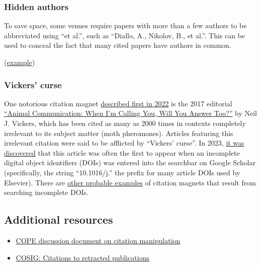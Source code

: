 \documentclass[letterpaper, 12pt]{article}
\begin{document}
\subsubsection*{Hidden authors}

To save space, some venues require papers with more than a few authors to be abbreviated using ``et al.'',
such as ``Diallo, A., Nikolov, B., et al.''.
This can be used to conceal the fact that many cited papers have authors in common.

(\href{https://pubpeer.com/publications/00DCF18F504B8C420F12A70B5FB30C}{example})

\subsubsection*{Vickers' curse}

One notorious citation magnet \href{https://forbetterscience.com/2022/10/31/when-im-citing-you-will-you-answer-too/}{described first in 2022} is the 2017 editorial \href{https://doi.org/10.1016/j.cub.2017.05.064}{``Animal Communication: When I’m Calling You, Will You Answer Too?''} by Neil J. Vickers, which has been cited as many as 2000 times in contexts completely irrelevant to its subject matter (moth pheromones). Articles featuring this irrelevant citation were said to be afflicted by ``Vickers' curse''. In 2023, \href{https://forbetterscience.com/2023/07/31/the-vickers-curse-secret-revealed/}{it was discovered} that this article was often the first to appear when an incomplete digital object identifiers (DOIs) was entered into the searchbar on Google Scholar (specifically, the string ``10.1016/j.'' the prefix for many article DOIs used by Elsevier). There are \href{https://pubpeer.com/publications/4BB5BE5F56EFEBC3A67D89D1EB5501}{other probable examples} of citation magnets that result from searching incomplete DOIs. 

\subsection*{Additional resources}

\begin{itemize}
    \setlength\itemsep{-0.5em}
    \item \href{https://doi.org/10.24318/cope.2019.3.1}{COPE discussion document on citation manipulation}
    \item \href{https://osf.io/9q3as}{COSIG: Citations to retracted publications}
\end{itemize}
\end{document}
